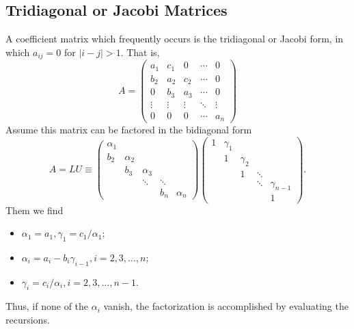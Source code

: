 \documentclass[../main.tex]{subfiles}
\begin{document}
\subsection{Tridiagonal or Jacobi Matrices}
A coefficient matrix which frequently occurs is the tridiagonal or Jacobi form, in which $a_{ij} = 0$ for $|i-j| > 1$. That is,
\begin{equation}
	A = \begin{pmatrix}
		a_1    & c_1    & 0      & \cdots & 0      \\
		b_2    & a_2    & c_2    & \cdots & 0      \\
		0      & b_3    & a_3    & \cdots & 0      \\
		\vdots & \vdots & \vdots & \ddots & \vdots \\
		0      & 0      & 0      & \cdots & a_n
	\end{pmatrix}
\end{equation}
Assume this matrix can be factored in the bidiagonal form
\begin{equation}
	A = LU \equiv \begin{pmatrix}
		\alpha_1 &          &          &        &          \\
		b_2      & \alpha_2 &          &        &          \\
		         & b_3      & \alpha_3 &        &          \\
		         &          & \ddots   & \ddots &          \\
		         &          &          & b_n    & \alpha_n
	\end{pmatrix} \begin{pmatrix}
		1 & \gamma_1 &          &        &              \\
		  & 1        & \gamma_2 &        &              \\
		  &          & 1        & \ddots &              \\
		  &          &          & \ddots & \gamma_{n-1} \\
		  &          &          &        & 1
	\end{pmatrix}.
\end{equation}
Them we find
\begin{itemize}
	\item $\alpha_1 = a_1, \gamma_1 = c_1 / \alpha_1$;
	\item $\alpha_i = a_i - b_i \gamma_{i-1}, i = 2, 3, \ldots, n$;
	\item $\gamma_i = c_i / \alpha_i, i = 2, 3, \ldots, n-1$.
\end{itemize}
Thus, if none of the $\alpha_i$ vanish, the factorization is accomplished by evaluating the recursions.
\end{document}
